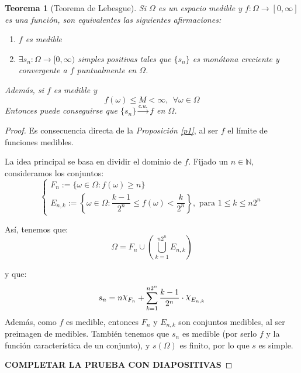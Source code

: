 \documentclass[11pt, a4paper]{article}
\DeclareRobustCommand{\rchi}{{\mathpalette\irchi\relax}}
\newcommand{\irchi}[2]{\raisebox{\depth}{$#1\chi$}} %
\theoremstyle{theorem-style}
\newtheorem{nth}{Teorema}[section]
\theoremstyle{definition-style}
\theoremstyle{remark-style}
\theoremstyle{example-style}
\newenvironment{nlist}
{\begin{enumerate}
    \renewcommand\labelenumi{(\emph{\roman{enumi})}}}
  {\end{enumerate}}
\begin{document}
\begin{nth}[Teorema de Lebesgue]
  Si $\Omega$ es un espacio medible y $f:\Omega \to [0,\infty]$ es una función, son equivalentes las siguientes afirmaciones:
  \begin{nlist}
  \item $f$ es medible
  \item $\exists s_n : \Omega \to [0,\infty)$ simples positivas tales que $\{s_n\}$ es monótona creciente y convergente a $f$ puntualmente en $\Omega$.
  \end{nlist}
  Además, si $f$ es medible y
  \[
    f(\omega) \leq M < \infty, \ \ \forall \omega \in \Omega
  \]
  Entonces puede conseguirse que $\{s_n\}\xrightarrow{c.u.}f$ en $\Omega$.
\end{nth}
\begin{proof}\hfill

  Es consecuencia directa de la \textit{Proposición \ref{p1}}, al ser $f$ el límite de funciones medibles.
  
   La idea principal se basa en dividir el dominio de $f$. Fijado un $n \in \mathbb{N}$, consideramos los conjuntos: 
  \[
    \begin{cases}
      F_n := \{\omega \in \Omega : f(\omega) \geq n\}\\
      E_{n,k} := \left\{\omega \in \Omega : \dfrac{k-1}{2^n} \leq f(\omega) < \dfrac{k}{2^n}\right\}, \text{ para } 1 \leq k \leq n2^n
    \end{cases}
  \]
  
  Así, tenemos que:
  \[
    \Omega = F_n \cup \left( \bigcup_{k=1}^{n2^n}E_{n,k} \right)
  \]
  
  y que:
  \[
    s_n = n\rchi_{F_n} + \sum_{k=1}^{n2^n}\dfrac{k-1}{2^n}\cdot \rchi_{E_{n,k}}
  \]
  Además, como $f$ es medible, entonces $F_n$ y $E_{n,k}$ son conjuntos medibles, al ser preimagen de medibles. También tenemos que $s_n$ es medible (por serlo $f$ y la función característica de un conjunto), y $s(\Omega)$ es finito, por lo que $s$ es simple.
  
  \textbf{COMPLETAR LA PRUEBA CON DIAPOSITIVAS}
\end{proof}
\end{document}

